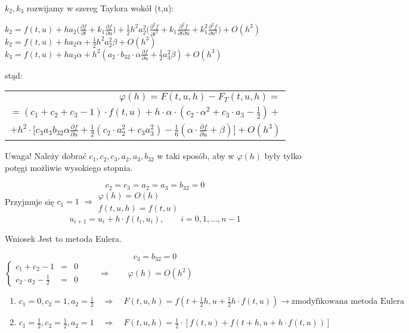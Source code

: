 \begin{frame}
	$k_2, k_3$ rozwijamy w szereg Taylora wokół (t,u):
    \begin{flushleft}
    	$k_2=f(t,u)+ha_2\bigg(\frac{\partial f}{\partial t}+k_1\frac{\partial f}{\partial u}\bigg) + \frac{1}{2}h^2a_2^2\bigg(\frac{\partial^2f}{\partial t^2}+k_1\frac{\partial^2f}{\partial t \partial u}+k_1^2\frac{\partial^2f}{\partial u^2}\bigg)+O(h^3)$ \newline
        $k_2 = f(t,u)+ha_2\alpha+\frac{1}{2}h^2a_2^2\beta+O(h^3)$ \newline
        $k_3 = f(t,u)+ha_3\alpha + h^2(a_2 \cdot b_{32} \cdot \alpha \frac{\partial f}{\partial u} + \frac{1}{2}a_3^2\beta) + O(h^3)$
    \end{flushleft}
    stąd:
    \begin{tabular}{r}
    	$\varphi(h) = F(t,u,h) - F_T(t,u,h) = $\\
    	$ = (c_1+c_2+c_3-1) \cdot f(t,u)+h \cdot \alpha \cdot (c_2 \cdot \alpha^2 + c_3 \cdot a_3 - \frac{1}{2}) + $ \\
        $+ h^2 \cdot \big[c_3a_3b_{32}\alpha\frac{\partial f}{\partial u}+\frac{1}{2}(c_2 \cdot a_2^2 +c_3a_3^2)-\frac{1}{6}(\alpha \cdot \frac{\partial f}{\partial u}+\beta)\big]+O(h^3) $
    \end{tabular}
    \begin{block}{Uwaga!}
    	Należy dobrać $c_1, c_2, c_3, a_2, a_3, b_{32}$ w taki sposób, aby w $\varphi(h)$ były tylko potęgi możliwie wysokiego stopnia.
    \end{block}
\end{frame}
\begin{frame}
    $$c_2=c_3=a_2=a_3=b_{32}=0$$
    Przyjmuje się $c_1 = 1$ \qquad $\Rightarrow \left.\begin{array}{l}
    \varphi(h) = O(h) \\
    f(t,u,h) = f(t,u)
    \end{array}\right.$
    $$u_{i+1} = u_i + h \cdot f(t_i,u_i), \qquad i = 0,1, \ldots,n-1$$
    \begin{block}{Wniosek}
    	Jest to metoda Eulera.
    \end{block}
\end{frame}
\begin{frame}
    $$c_3 = b_{32} = 0$$
    $\left\{\begin{array}{rcl}
    	c_1 + c_2 - 1 & = & 0\\
        c_2 \cdot a_2 - \frac{1}{2} & = & 0
    \end{array}\right. \qquad\Rightarrow \qquad \varphi(h) = O(h^2)$
    \begin{enumerate}
      \item $c_1 = 0, c_2 = 1, a_2 = \frac{1}{2} \quad \Rightarrow \quad F(t,u,h) = f(t+\frac{1}{2}h, u+\frac{1}{2}h \cdot f(t,u)) \rightarrow \text{zmodyfikowana metoda Eulera}$
      \item $c_1 = \frac{1}{2}, c_2 = \frac{1}{2}, a_2 = 1 \quad\Rightarrow\quad F(t,u,h) = \frac{1}{2} \cdot[f(t,u)+f(t+h,u+h \cdot f(t,u))]$
    \end{enumerate}
\end{frame}
